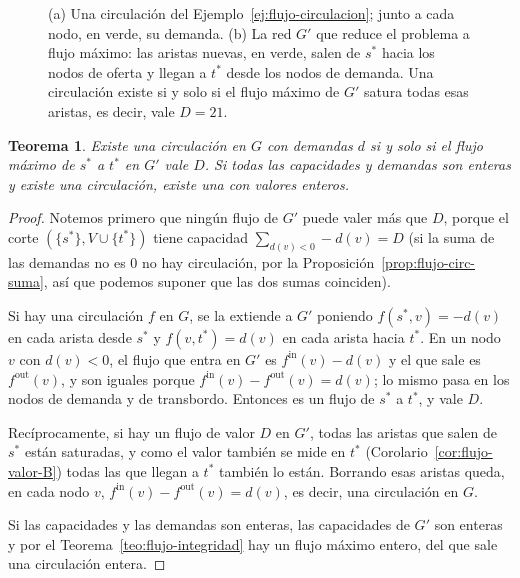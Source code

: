 \documentclass[12pt, spanish, oneside, openany]{book}
\theoremstyle{uprightplain}
\newtheorem{teorema}{Teorema}[section]
\theoremstyle{definition}
\theoremstyle{remark}
\theoremstyle{definition}
\begin{document}
\begin{figure}[H]
\caption{(a) Una circulación del Ejemplo~\ref{ej:flujo-circulacion}; junto a cada
nodo, en verde, su demanda. (b) La red $G'$ que reduce el problema a flujo
máximo: las aristas nuevas, en verde, salen de $s^{*}$ hacia los nodos de oferta
y llegan a $t^{*}$ desde los nodos de demanda. Una circulación existe si y solo
si el flujo máximo de $G'$ satura todas esas aristas, es decir, vale $D=21$.}
\label{fig:flujo-circulacion}
\end{figure}

\begin{teorema}
\label{teo:flujo-circ-flujo}
Existe una circulación en $G$ con demandas $d$ si y solo si el flujo máximo de $s^{*}$ a $t^{*}$ en $G'$ vale $D$. Si todas las capacidades y demandas son enteras y existe una circulación, existe una con valores enteros.
\end{teorema}
\begin{proof}
Notemos primero que ningún flujo de $G'$ puede valer más que $D$, porque el corte $(\{s^{*}\},V\cup\{t^{*}\})$ tiene capacidad $\sum_{d(v)<0}-d(v)=D$ (si la suma de las demandas no es $0$ no hay circulación, por la Proposición~\ref{prop:flujo-circ-suma}, así que podemos suponer que las dos sumas coinciden).

Si hay una circulación $f$ en $G$, se la extiende a $G'$ poniendo $f(s^{*},v)=-d(v)$ en cada arista desde $s^{*}$ y $f(v,t^{*})=d(v)$ en cada arista hacia $t^{*}$. En un nodo $v$ con $d(v)<0$, el flujo que entra en $G'$ es $f^{\mathrm{in}}(v)-d(v)$ y el que sale es $f^{\mathrm{out}}(v)$, y son iguales porque $f^{\mathrm{in}}(v)-f^{\mathrm{out}}(v)=d(v)$; lo mismo pasa en los nodos de demanda y de transbordo. Entonces es un flujo de $s^{*}$ a $t^{*}$, y vale $D$.

Recíprocamente, si hay un flujo de valor $D$ en $G'$, todas las aristas que salen de $s^{*}$ están saturadas, y como el valor también se mide en $t^{*}$ (Corolario~\ref{cor:flujo-valor-B}) todas las que llegan a $t^{*}$ también lo están. Borrando esas aristas queda, en cada nodo $v$, $f^{\mathrm{in}}(v)-f^{\mathrm{out}}(v)=d(v)$, es decir, una circulación en $G$.

Si las capacidades y las demandas son enteras, las capacidades de $G'$ son enteras y por el Teorema~\ref{teo:flujo-integridad} hay un flujo máximo entero, del que sale una circulación entera.
\end{proof}
\end{document}
